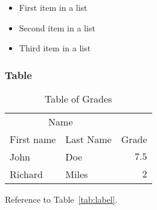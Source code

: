 \begin{itemize}[noitemsep] %
\item First item in a list
\item Second item in a list
\item Third item in a list
\end{itemize}

\subsubsection{Table}

\lipsum[13] %

\begin{table}[hbt]
\caption{Table of Grades}
\centering
\begin{tabular}{llr}
\toprule
\multicolumn{2}{c}{Name} \\
\cmidrule(r){1-2}
First name & Last Name & Grade \\
\midrule
John & Doe & $7.5$ \\
Richard & Miles & $2$ \\
\bottomrule
\end{tabular}
\label{tab:label}
\end{table}

Reference to Table~\vref{tab:label}. %




